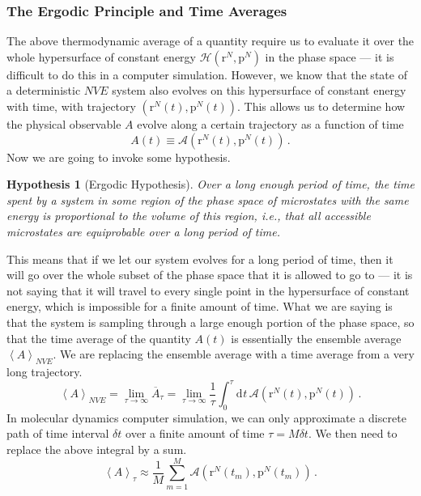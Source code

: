\documentclass{article}
\theoremstyle{plain}\theoremheaderfont{\normalfont\itshape}\theorembodyfont{\rmfamily}\theoremseparator{.}\newtheorem*{rem}{Remark}\newtheorem*{ex}{Example}\newtheorem*{proof}{Proof}\newtheorem*{altp}{Alternative proof}
\theoremstyle{plain}\theoremheaderfont{\normalfont\bfseries}\theorembodyfont{\rmfamily}\theoremseparator{.}\newtheorem{thm}{Theorem}[section]\newtheorem{lem}[thm]{Lemma}\newtheorem{prop}[thm]{Proposition}\newtheorem*{cor}{Corollary}\newtheorem{defn}[thm]{Definition}\newtheorem{clm}[thm]{Claim}\newtheorem{clminproof}{Claim}\newtheorem{alg}[thm]{Algorithm}\newtheorem{hyp}[thm]{Hypothesis}\newtheorem{law}[thm]{Law}
\theoremstyle{break}\theoremheaderfont{\normalfont\itshape}\theorembodyfont{\rmfamily}\theoremseparator{.\medskip}\newtheorem*{proofskip}{Proof}\newtheorem*{exs}{Examples}\newtheorem*{rems}{Remarks}
\theoremstyle{break}\theoremheaderfont{\normalfont\bfseries}\theorembodyfont{\rmfamily}\theoremseparator{.\medskip}\newtheorem{lemskip}[thm]{Lemma}\newtheorem{defnskip}[thm]{Definition}\newtheorem{propskip}[thm]{Proposition}\newtheorem{thmskip}[thm]{Theorem}
\numberwithin{equation}{section}
\newcommand{\dd}[2][]{\mathrm{d}^{#1} #2\,}
\newcommand{\eval}[1]{\left\langle #1 \right\rangle}
\newcommand{\vb}[1]{\bm{\mathrm{#1}}}
\begin{document}
    \subsubsection{The Ergodic Principle and Time Averages}
    The above thermodynamic average of a quantity require us to evaluate it over the whole hypersurface of constant energy \(\mathcal{H}(\vb{r}^N,\vb{p}^N)\) in the phase space --- it is difficult to do this in a computer simulation. However, we know that the state of a deterministic \(NVE\) system also evolves on this hypersurface of constant energy with time, with trajectory \((\vb{r}^N(t),\vb{p}^N(t))\). This allows us to determine how the physical observable \(A\) evolve along a certain trajectory as a function of time
    \begin{equation}
        A(t)\equiv \mathcal{A}(\vb{r}^N(t),\vb{p}^N(t))\,.
    \end{equation}
    Now we are going to invoke some hypothesis.
    \begin{hyp}[Ergodic Hypothesis]
        Over a long enough period of time, the time spent by a system in some region of the phase space of microstates with the same energy is proportional to the volume of this region, i.e., that all accessible microstates are equiprobable over a long period of time.
    \end{hyp}
    This means that if we let our system evolves for a long period of time, then it will go over the whole subset of the phase space that it is allowed to go to --- it is not saying that it will travel to every single point in the hypersurface of constant energy, which is impossible for a finite amount of time. What we are saying is that the system is sampling through a large enough portion of the phase space, so that the time average of the quantity \(A(t)\) is essentially the ensemble average \(\eval{A}_{NVE}\). We are replacing the ensemble average with a time average from a very long trajectory.
    \begin{equation}
        \eval{A}_{NVE}=\lim_{\tau\to\infty}\overline{A}_{\tau}=\lim_{\tau\to\infty}\frac{1}{\tau}\int_{0}^{\tau}\dd{t}\mathcal{A}(\vb{r}^N(t),\vb{p}^N(t))\,.
    \end{equation}
    In molecular dynamics computer simulation, we can only approximate a discrete path of time interval \(\delta t\) over a finite amount of time \(\tau=M\delta t\). We then need to replace the above integral by a sum.
    \begin{equation}
        \eval{A}_{\tau}\approx\frac{1}{M}\sum_{m=1}^{M}\mathcal{A}(\vb{r}^N(t_m),\vb{p}^N(t_m))\,.
    \end{equation}
    
\end{document}
